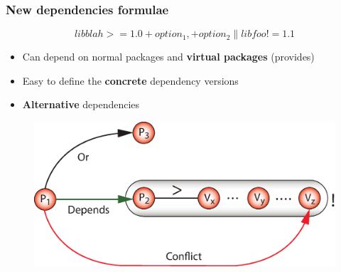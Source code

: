 \documentclass{beamer}
\begin{document}
\begin{frame}
\frametitle{New dependencies formulae}
\large{\[libblah >= 1.0 +option_1, +option_2 \| libfoo != 1.1\]}
\begin{itemize}
  \item<2-> Can depend on normal packages and \textbf{virtual packages} (provides)
  \item<3-> Easy to define the \textbf{concrete} dependency versions
  \item<4-> \textbf{Alternative} dependencies
\end{itemize}
\begin{figure}[h!]
  \centering
  \includegraphics[height=0.3\textheight]{q6.eps}
\end{figure}
\end{frame}


\end{document}
